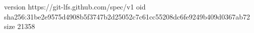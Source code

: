 version https://git-lfs.github.com/spec/v1
oid sha256:31be2e9575d4908b5f3747b2d25052c7c61cc55208dc6fe9249b409d0367ab72
size 21358

